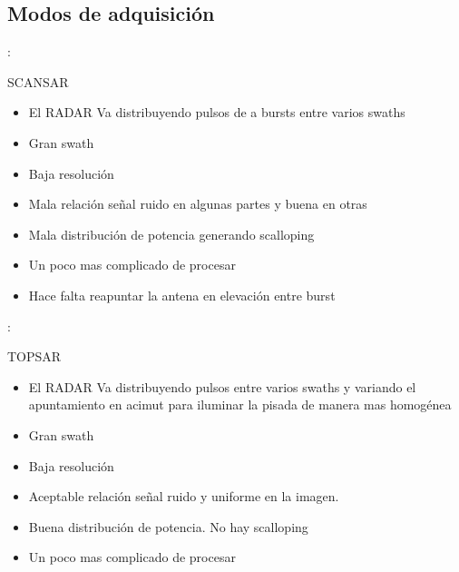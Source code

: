 \subsection{Modos de adquisición}

\begin{frame}{\secname : \subsecname}
    \begin{block}{SCANSAR}
      \begin{itemize}
        \item El RADAR Va distribuyendo pulsos de  a bursts entre varios swaths
        \item Gran swath
        \item Baja resolución
        \item Mala relación señal ruido en algunas partes y buena en otras
        \item Mala distribución de potencia generando scalloping
        \item Un poco mas complicado de procesar
        \item Hace falta reapuntar la antena en elevación entre burst
      \end{itemize}
    \end{block}
\end{frame}

\begin{frame}{\secname : \subsecname}
    \begin{block}{TOPSAR}
      \begin{itemize}
        \item El RADAR Va distribuyendo pulsos entre varios swaths y variando el apuntamiento en acimut para iluminar la pisada de manera mas homogénea
        \item Gran swath
        \item Baja resolución
        \item Aceptable relación señal ruido y uniforme en la imagen.
        \item Buena distribución de potencia. No hay scalloping
        \item Un poco mas complicado de procesar
      \end{itemize}
    \end{block}
\end{frame}

